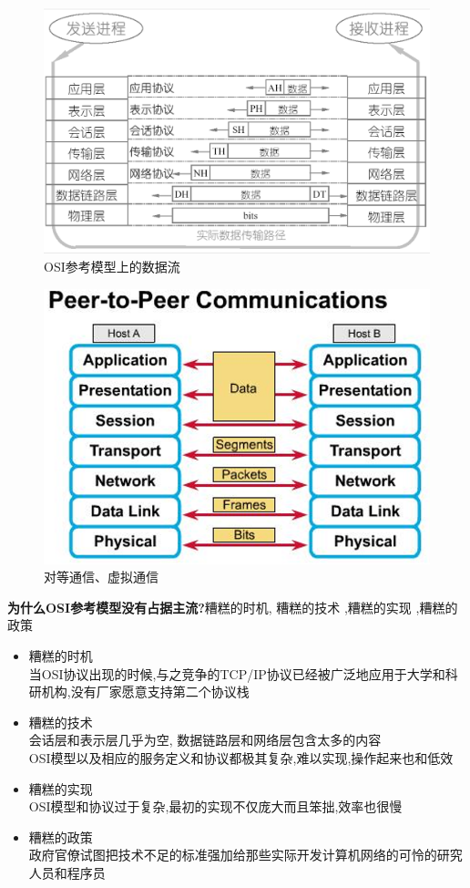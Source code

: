 \documentclass[UTF8,a4paper]{ctexart}
\begin{document}
  \begin{figure}[H]
    \centering
    \includegraphics[scale = 0.3]{assets/jisuanjiwangluo_3ab21.png}
    \caption{OSI参考模型上的数据流}
  \end{figure}

  \begin{figure}[H]
    \centering
    \includegraphics[scale = 0.3]{assets/jisuanjiwangluo_6d9c7.png}
    \caption{对等通信、虚拟通信}
  \end{figure}

  \textbf{为什么OSI参考模型没有占据主流?}糟糕的时机, 糟糕的技术 ,糟糕的实现 ,糟糕的政策
  \begin{itemize}
    \item 糟糕的时机\\
    当OSI协议出现的时候,与之竞争的TCP/IP协议已经被广泛地应用于大学和科研机构,没有厂家愿意支持第二个协议栈

    \item 糟糕的技术\\
    会话层和表示层几乎为空, 数据链路层和网络层包含太多的内容\\
    OSI模型以及相应的服务定义和协议都极其复杂,难以实现,操作起来也和低效
    \item 糟糕的实现\\
    OSI模型和协议过于复杂,最初的实现不仅庞大而且笨拙,效率也很慢
    \item 糟糕的政策\\
    政府官僚试图把技术不足的标准强加给那些实际开发计算机网络的可怜的研究人员和程序员
  \end{itemize}
\end{document}
